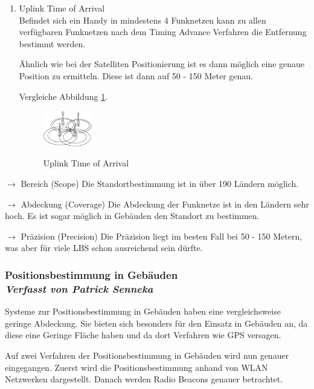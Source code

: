 \begin{enumerate}
\item Uplink Time of Arrival \\
Befindet sich ein Handy in mindestens 4 Funknetzen kann zu allen verfügbaren Funknetzen nach dem \glqq Timing Advance \grqq Verfahren die Entfernung bestimmt werden. 

Ähnlich wie bei der Satelliten Positionierung ist es dann möglich eine genaue Position zu ermitteln. Diese ist dann auf 50 - 150 Meter genau.
\cite[S. 209]{Schiller2004}

Vergleiche Abbildung \ref{fig:Up}.

\begin{figure}[h]
\centering
\includegraphics[width=0.2\textwidth]{ref/images/Uplink.PNG}
\caption[Uplink Time of Arrival]{Uplink Time of Arrival}
\label{fig:Up}
\cite[S. 209]{Schiller2004}
\end{figure}

\end{enumerate}


$\longrightarrow$ Bereich (Scope) Die Standortbestimmung ist in über 190 Ländern möglich. 

$\longrightarrow$ Abdeckung (Coverage) Die Abdeckung der Funknetze ist in den Ländern sehr hoch. Es ist sogar möglich in Gebäuden den Standort zu bestimmen.

$\longrightarrow$ Präzision (Precision) Die Präzision liegt im besten Fall bei 50 - 150 Metern, was aber für viele LBS schon ausreichend sein dürfte.



\newpage
\subsubsection[Positionsbestimmung in Gebäuden]{Positionsbestimmung in Gebäuden
 \\ \textnormal{\small{\textit {Verfasst von Patrick Senneka}}}}

Systeme zur Positionsbestimmung in Gebäuden haben eine vergleichsweise geringe Abdeckung. Sie bieten sich besonders für den Einsatz in Gebäuden an, da diese eine Geringe Fläche haben und  da dort Verfahren wie GPS versagen. 

Auf zwei Verfahren der Positionsbestimmung in Gebäuden wird nun genauer eingegangen. Zuerst wird die Positionsbestimmung anhand von WLAN Netzwerken dargestellt. Danach werden Radio Beacons genauer betrachtet.

